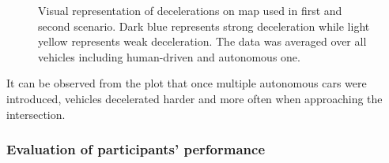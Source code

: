 \documentclass[11pt,english]{article}
\begin{document}
\begin{figure}[h]
\centering
{}


\caption{Visual representation of decelerations on map used in first and second scenario. Dark blue represents strong deceleration while light yellow represents weak deceleration. The data was averaged over all vehicles including human-driven and autonomous one.}
\label{fig:decelerations1}
\end{figure}

It can be observed from the plot that once multiple autonomous cars were introduced, vehicles decelerated harder and more often when approaching the intersection.







\subsubsection{Evaluation of participants' performance}
\paragraph{}
\end{document}
